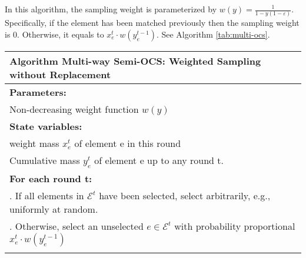 \documentclass{article}
\begin{document}
In this algorithm, the sampling weight is parameterized by $w(y)  =\frac{1}{1-y(1-\varepsilon)}$.
Specifically, if the element has been matched previously then the sampling weight is $0$. 
Otherwise, it equals to $x_{e}^{t} \cdot w\left(y_{e}^{t-1}\right)$. 
See Algorithm \ref{tab:multi-ocs}.
\\
\begin{tabular}{l}
\toprule  %
\textbf{Algorithm} Multi-way Semi-OCS: Weighted Sampling without Replacement\\
\midrule  %
\textbf{Parameters:} \\
\quad Non-decreasing weight function $w(y)$
\\
\textbf{State variables:}\\
\quad  weight mass $x_e^t$ of element e in this round 
\\
\quad  Cumulative mass $y_e^t$  of element e up to any round t.

\\
\textbf{For each round t:}\\
\quad 1. If all elements in $\mathcal{E}^{t}$ have been selected, select arbitrarily, e.g., uniformly at random.
\\
\quad 2. Otherwise, select an unselected $e \in \mathcal{E}^{t}$ with probability proportional $x_{e}^{t} \cdot w\left(y_{e}^{t-1}\right)$
\\
\bottomrule %
\label{tab:multi-ocs}
\end{tabular}
\end{document}
